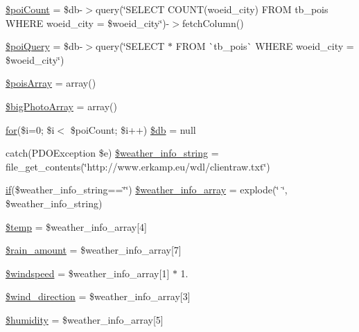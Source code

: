 \begin{DoxyCompactItemize}
\item 
\mbox{\hyperlink{rotterdam_2index_8php_a8fb5f82500861c51c8fcfd700321e59e}{\$poi\+Count}} = \$db-\/$>$query(\char`\"{}S\+E\+L\+E\+CT C\+O\+U\+NT(woeid\+\_\+city) F\+R\+OM tb\+\_\+pois W\+H\+E\+RE woeid\+\_\+city = \$woeid\+\_\+city\char`\"{})-\/$>$fetch\+Column()
\item 
\mbox{\hyperlink{rotterdam_2index_8php_a735d09bd88bab2d39b5d123b6a1ac7e9}{\$poi\+Query}} = \$db-\/$>$query(\char`\"{}S\+E\+L\+E\+CT $\ast$ F\+R\+OM \`{}tb\+\_\+pois\`{} W\+H\+E\+RE woeid\+\_\+city = \$woeid\+\_\+city\char`\"{})
\item 
\mbox{\hyperlink{rotterdam_2index_8php_aba22eb823924400ba310cca9821c67b3}{\$pois\+Array}} = array()
\item 
\mbox{\hyperlink{rotterdam_2index_8php_aab544b20d0152a1bf9eeb8db3e9f0577}{\$big\+Photo\+Array}} = array()
\item 
\mbox{\hyperlink{index_8php_aa11bce3c9d33806cade344b0536e0508}{for}}(\$i=0; \$i$<$ \$poi\+Count; \$i++) \mbox{\hyperlink{rotterdam_2index_8php_ae26e87d17180fc87313d19b439092f0f}{\$db}} = null
\item 
catch(P\+D\+O\+Exception \$e) \mbox{\hyperlink{rotterdam_2index_8php_aa85edc6c515eee98e2848667893e007d}{\$weather\+\_\+info\+\_\+string}} = file\+\_\+get\+\_\+contents(\char`\"{}http\+://www.\+erkamp.\+eu/wdl/clientraw.\+txt\char`\"{})
\item 
\mbox{\hyperlink{hull_2index_8php_a8f0d8893361d6307986497540738a8bf}{if}}(\$weather\+\_\+info\+\_\+string==\char`\"{}\char`\"{}) \mbox{\hyperlink{rotterdam_2index_8php_a16271cc4158d1822fa59adaf196eb3d4}{\$weather\+\_\+info\+\_\+array}} = explode(\char`\"{} \char`\"{}, \$weather\+\_\+info\+\_\+string)
\item 
\mbox{\hyperlink{rotterdam_2index_8php_a0d57fb0317e19ec798aa625381ebf342}{\$temp}} = \$weather\+\_\+info\+\_\+array\mbox{[}4\mbox{]}
\item 
\mbox{\hyperlink{rotterdam_2index_8php_a2aa7fd45b683a3c60b6f5e5d11a027b3}{\$rain\+\_\+amount}} = \$weather\+\_\+info\+\_\+array\mbox{[}7\mbox{]}
\item 
\mbox{\hyperlink{rotterdam_2index_8php_a98bffc039f434ba80b316614e0fc94db}{\$windspeed}} = \$weather\+\_\+info\+\_\+array\mbox{[}1\mbox{]} $\ast$ 1.
\item 
\mbox{\hyperlink{rotterdam_2index_8php_acae9d7e1905e3a01e07d87856885aa2c}{\$wind\+\_\+direction}} = \$weather\+\_\+info\+\_\+array\mbox{[}3\mbox{]}
\item 
\mbox{\hyperlink{rotterdam_2index_8php_aff5636a5f8216e0c22399f0c2d78a80d}{\$humidity}} = \$weather\+\_\+info\+\_\+array\mbox{[}5\mbox{]}

\end{DoxyCompactItemize}

